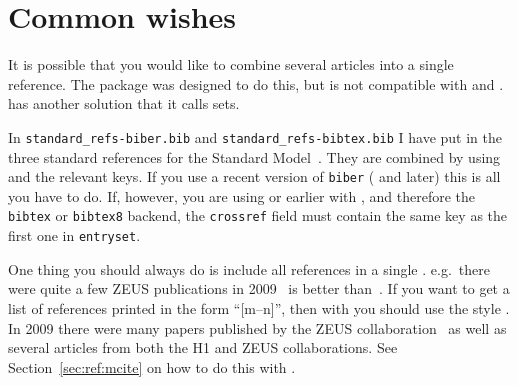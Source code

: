 \section{Common wishes}
\label{sec:ref:tips}

It is possible that you would like to combine several articles into a
single reference. The  package was designed to do this,
but is not compatible with  and
.  has another solution that it
calls sets.

In \texttt{standard\_refs-biber.bib} and
\texttt{standard\_refs-bibtex.bib} I have put in the three standard
references for the Standard Model~\cite{gsw}. They are combined by
using  and the relevant
keys. If you use a recent version of \texttt{biber} ( and later)
this is all you have to do.  If, however, you are using  or earlier with , and therefore the \texttt{bibtex} or \texttt{bibtex8} backend, the
\texttt{crossref} field must contain the same key as the first one in
\texttt{entryset}.

One thing you should always do is include all references in a single
. e.g.\ there were quite a few ZEUS publications in
2009~\cite{Chekanov:2009qja,Chekanov:2009zz,Chekanov:2009tu} is better
than~\cite{Chekanov:2009qja}\cite{Chekanov:2009zz}\cite{Chekanov:2009tu}.
If you want to get a list of references printed in the form \enquote{[m--n]},
then with  you should use the style
. In 2009 there were many papers published by the
ZEUS
collaboration~\cite{Chekanov:2009qja,Chekanov:2009zz,Chekanov:2009tu}
as well as several articles from both the H1 and ZEUS
collaborations\cite{Chekanov:2009wt,Aaron:2009wg}. See
Section~\ref{sec:ref:mcite} on how to do this with \BibTeX.

